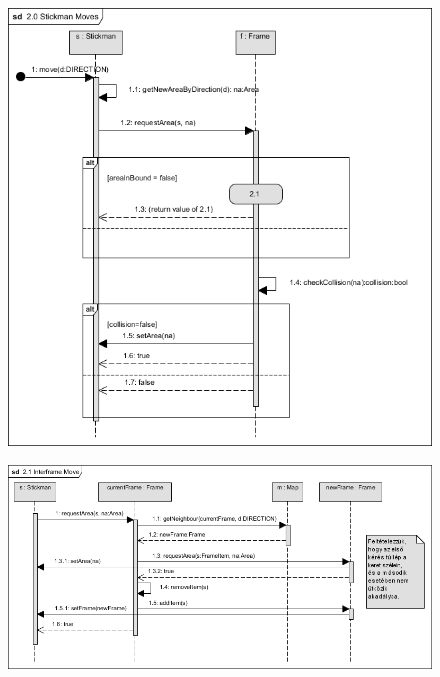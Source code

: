 		\begin{figure}[ht!]
			\begin{center}
				\includegraphics[scale=0.8]{resources/seq_2-0_stickmanMoves.png}
				\caption{}
			\end{center}
		\end{figure}
		
		\begin{figure}[ht!]
			\begin{center}
				\includegraphics[scale=0.8]{resources/seq_2-1_interframeMove.png}
				\caption{}
			\end{center}
		\end{figure}
		
